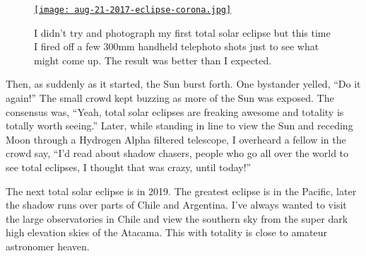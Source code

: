 %

 \begin{SCfigure} 
 \centering
\href{https://conceptcontrol.smugmug.com/Places/USA-and-Canada/Idaho-Instants/i-25dfJkS/A}{\texttt{[image: aug-21-2017-eclipse-corona.jpg]}}
 \caption[I didn't try and photograph my first total solar eclipse but this time I
fired off a few 300mm handheld telephoto shots.]{I didn't try and photograph my first total solar eclipse but this time I
fired off a few 300mm handheld telephoto shots just to see what might
come up. The result was better than I expected.}
 \label{fig:5340x5}
 \end{SCfigure}


Then, as suddenly as it started, the Sun burst forth. One bystander
yelled, ``Do it again!'' The small crowd kept buzzing as more of the Sun
was exposed. The consensus was, ``Yeah, total solar eclipses are
freaking awesome and totality is totally worth seeing.'' Later, while
standing in line to view the Sun and receding Moon through a Hydrogen
Alpha filtered telescope, I overheard a fellow in the crowd say, ``I'd
read about shadow chasers, people who go all over the world to see total
eclipses, I thought that was crazy, until today!''

The next total solar eclipse is in 2019. The greatest eclipse is in the
Pacific, later the shadow runs over parts of Chile and Argentina. I've
always wanted to visit the large observatories in Chile and view the
southern sky from the super dark high elevation skies of the Atacama.
This with totality is close to amateur astronomer heaven.




